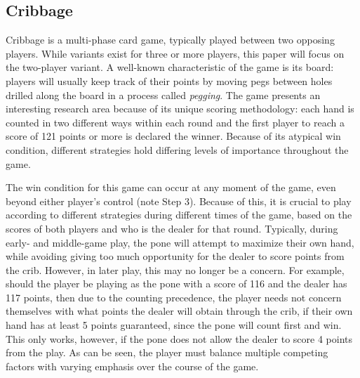 

\subsection{Cribbage}

Cribbage is a multi-phase card game, typically played between two opposing
players.
%
While variants exist for three or more players, this paper will focus on the
two-player variant.
%
A well-known characteristic of the game is its board:
players will usually keep track of their points by moving pegs
between holes drilled along the board
in a process called \textit{pegging}.
%
The game presents an interesting research area because of its unique scoring
methodology:
each hand is counted in two different ways within each round and the
first player to reach a score of 121 points or more is declared the winner.
%
Because of its atypical win condition, different strategies hold differing
levels of importance throughout the game.




The win condition for this game can occur at any moment of the game,
even beyond either player's control (note Step 3).
%
Because of this,
it is crucial to play according to different strategies during
different times of the game,
based on the scores of both players and who is the dealer for that round.
%
Typically, during early- and middle-game play,
the pone will attempt to maximize their own hand,
while avoiding giving too much opportunity for the dealer to score points from
the crib.
%
However, in later play, this may no longer be a concern.
%
For example, should the player be playing as the pone with a score of 116
and the dealer has 117 points,
then due to the counting precedence,
the player needs not concern themselves with what points the dealer will obtain
through the crib, if their own hand has at least 5 points guaranteed,
since the pone will count first and win.
%
This only works, however, if the pone does not allow the dealer to score 4
points from the play.
%
As can be seen, the player must balance multiple competing factors with varying
emphasis over the course of the game.

